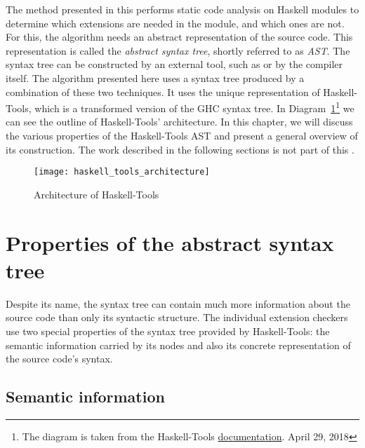 \documentclass[main.tex]{subfiles}
\begin{document}
	
	The method presented in this \paper{} performs static code analysis on Haskell modules to determine which extensions are needed in the module, and which ones are not. For this, the algorithm needs an abstract representation of the source code. This representation is called the \emph{abstract syntax tree}, shortly referred to as \emph{AST}. The syntax tree can be constructed by an external tool, such as \cite{haskell-src-exts} or by the compiler itself. The algorithm presented here uses a syntax tree produced by a combination of these two techniques. It uses the unique representation of Haskell-Tools, which is a transformed version of the GHC syntax tree. In Diagram~\ref{fig:haskell-tools-architecture}\footnote{The diagram is taken from the Haskell-Tools \href{https://github.com/haskell-tools/haskell-tools/blob/master/documentation/haskell_tools_architecture.png}{documentation}. April 29, 2018 } we can see the outline of Haskell-Tools' architecture. In this chapter, we will discuss the various properties of the Haskell-Tools AST and present a general overview of its construction. The work described in the following sections is not part of this \paper{}. 
	
	\begin{figure}[H]
		\renewcommand{\figurename}{Diagram}
		\hspace{-1cm}
		\centering
		\caption{Architecture of Haskell-Tools}
		\texttt{[image: haskell\_tools\_architecture]}
		\label{fig:haskell-tools-architecture}
	\end{figure}
	
	\newpage
	
	\section{Properties of the abstract syntax tree}
	
	Despite its name, the syntax tree can contain much more information about the source code than only its syntactic structure. The individual extension checkers use two special properties of the syntax tree provided by Haskell-Tools: the semantic information carried by its nodes and also its concrete representation of the source code's syntax.
	
	\subsection{Semantic information}
	
	
\end{document}
